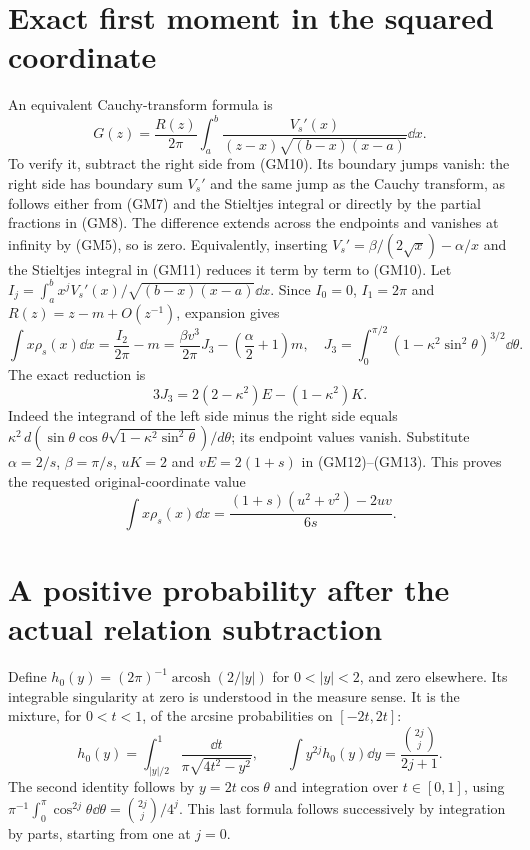 \documentclass[11pt]{article}
\begin{document}
\section{Exact first moment in the squared coordinate}
An equivalent Cauchy-transform formula is
\begin{equation}\tag{GM11}
 G(z)=\frac{R(z)}{2\pi}
 \int_a^b\frac{V_s'(x)}{(z-x)\sqrt{(b-x)(x-a)}}\dd x.
\end{equation}
To verify it, subtract the right side from (GM10). Its boundary jumps
vanish: the right side has boundary sum $V_s'$ and the same jump as
the Cauchy transform, as follows either from (GM7) and the Stieltjes
integral or directly by the partial fractions in (GM8).
The difference extends across the endpoints and vanishes at infinity
by (GM5), so is zero. Equivalently, inserting
$V_s'=\beta/(2\sqrt x)-\alpha/x$ and the Stieltjes integral in (GM11)
reduces it term by term to (GM10).
Let $I_j=\int_a^b x^jV_s'(x)/\sqrt{(b-x)(x-a)}\dd x$.
Since $I_0=0$, $I_1=2\pi$ and $R(z)=z-m+O(z^{-1})$, expansion gives
\begin{equation}\tag{GM12}
 \int x\rho_s(x)\dd x=\frac{I_2}{2\pi}-m
 =\frac{\beta v^3}{2\pi}J_3-\left(\frac\alpha2+1\right)m,
 \quad J_3=\int_0^{\pi/2}(1-\kappa^2\sin^2\theta)^{3/2}\dd\theta.
\end{equation}
The exact reduction is
\begin{equation}\tag{GM13}
 3J_3=2(2-\kappa^2)E-(1-\kappa^2)K.
\end{equation}
Indeed the integrand of the left side minus the right side equals
$\kappa^2\,d(\sin\theta\cos\theta
\sqrt{1-\kappa^2\sin^2\theta})/d\theta$; its endpoint values vanish.
Substitute $\alpha=2/s$, $\beta=\pi/s$, $uK=2$ and $vE=2(1+s)$
in (GM12)--(GM13). This proves the requested original-coordinate value
\begin{equation}\tag{GM14}
 \boxed{\displaystyle\int x\rho_s(x)\dd x
 =\frac{(1+s)(u^2+v^2)-2uv}{6s}.}
\end{equation}

\section{A positive probability after the actual relation subtraction}
Define $h_0(y)=(2\pi)^{-1}\operatorname{arcosh}(2/|y|)$ for $0<|y|<2$,
and zero elsewhere. Its integrable singularity at zero is understood in
the measure sense. It is the mixture, for $0<t<1$, of the arcsine
probabilities on $[-2t,2t]$:
\begin{equation}\tag{GM15}
 h_0(y)=\int_{|y|/2}^1\frac{\dd t}{\pi\sqrt{4t^2-y^2}},\qquad
 \int y^{2j}h_0(y)\dd y=\frac{\binom{2j}j}{2j+1}.
\end{equation}
The second identity follows by $y=2t\cos\theta$ and integration over
$t\in[0,1]$, using
$\pi^{-1}\int_0^\pi\cos^{2j}\theta\dd\theta=\binom{2j}j/4^j$.
This last formula follows successively by integration by parts, starting
from one at $j=0$.
\end{document}
